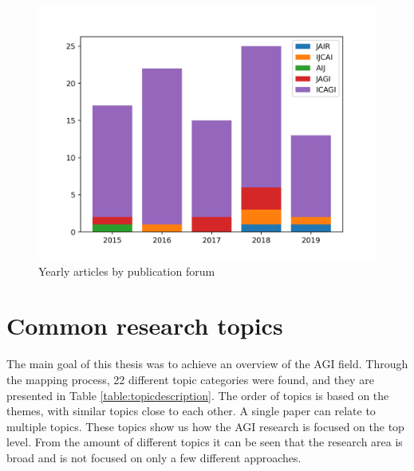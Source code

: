 \begin{figure}[H]
  \centering
  \includegraphics[scale=0.60]{material/data/yearly_publications.png}
  \caption{Yearly articles by publication forum}
  \label{fig:yearlybar}
\end{figure}

\section{Common research topics}

The main goal of this thesis was to achieve an overview of the AGI field.
Through the mapping process, 22 different topic categories were found, and they
are presented in Table \ref{table:topicdescription}. The order of topics is
based on the themes, with similar topics close to each other. A single paper can
relate to multiple topics. These topics show us how the AGI research is focused
on the top level. From the amount of different topics it can be seen that the
research area is broad and is not focused on only a few different approaches. 

